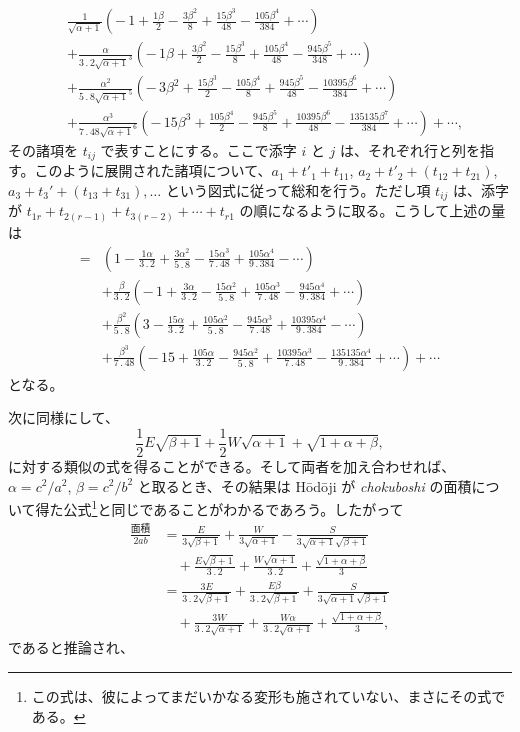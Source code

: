 \documentclass[11pt]{article}
\newcommand{\scanpage}[2]{\clearpage\setcounter{footnote}{0}\noindent{\footnotesize\color{gray}PDF #1 頁 · #2}\par\medskip}
\begin{document}
\scanpage{0334}{印刷頁 320}
\[
\begin{aligned}
&\frac{1}{\sqrt{\alpha+1}}\left(-\,1+\frac{1\beta}{2}-\frac{3\beta^2}{8}+\frac{15\beta^3}{48}-\frac{105\beta^4}{384}+\cdots\right)\\
&+\frac{\alpha}{3\,.\,2\sqrt{\alpha+1}^{3}}\left(-\,1\beta+\frac{3\beta^2}{2}-\frac{15\beta^3}{8}+\frac{105\beta^4}{48}-\frac{945\beta^5}{348}+\cdots\right)\\
&+\frac{\alpha^2}{5\,.\,8\sqrt{\alpha+1}^{5}}\left(-\,3\beta^2+\frac{15\beta^3}{2}-\frac{105\beta^4}{8}+\frac{945\beta^5}{48}-\frac{10395\beta^6}{384}+\cdots\right)\\
&+\frac{\alpha^3}{7\,.\,48\sqrt{\alpha+1}^{6}}\left(-\,15\beta^3+\frac{105\beta^4}{2}-\frac{945\beta^5}{8}+\frac{10395\beta^6}{48}-\frac{135135\beta^7}{384}+\cdots\right)+\cdots,
\end{aligned}
\]
その諸項を $t_{ij}$ で表すことにする。ここで添字 $i$ と $j$ は、それぞれ行と列を指す。このように展開された諸項について、$a_1+t'_1+t_{11}$, $a_2+t'_2+(t_{12}+t_{21})$, $a_3+t_3'+(t_{13}+t_{31}),\ldots$ という図式に従って総和を行う。ただし項 $t_{ij}$ は、添字が $t_{1r}+t_{2(r-1)}+t_{3(r-2)}+\cdots+t_{r1}$ の順になるように取る。こうして上述の量は
\[
\begin{aligned}
={}&\left(1-\frac{1\alpha}{3\,.\,2}+\frac{3\alpha^2}{5\,.\,8}-\frac{15\alpha^3}{7\,.\,48}+\frac{105\alpha^4}{9\,.\,384}-\cdots\right)\\
&+\frac{\beta}{3\,.\,2}\left(-\,1+\frac{3\alpha}{3\,.\,2}-\frac{15\alpha^2}{5\,.\,8}+\frac{105\alpha^3}{7\,.\,48}-\frac{945\alpha^4}{9\,.\,384}+\cdots\right)\\
&+\frac{\beta^2}{5\,.\,8}\left(3-\frac{15\alpha}{3\,.\,2}+\frac{105\alpha^2}{5\,.\,8}-\frac{945\alpha^3}{7\,.\,48}+\frac{10395\alpha^4}{9\,.\,384}-\cdots\right)\\
&+\frac{\beta^3}{7\,.\,48}\left(-\,15+\frac{105\alpha}{3\,.\,2}-\frac{945\alpha^2}{5\,.\,8}+\frac{10395\alpha^3}{7\,.\,48}-\frac{135135\alpha^4}{9\,.\,384}+\cdots\right)+\cdots
\end{aligned}
\]
となる。

次に同様にして、
\[
\frac{1}{2}E\sqrt{\beta+1}+\frac{1}{2}W\sqrt{\alpha+1}+\sqrt{1+\alpha+\beta},
\]
に対する類似の式を得ることができる。そして両者を加え合わせれば、$\alpha=c^2/a^2$, $\beta=c^2/b^2$ と取るとき、その結果は Hōdōji が \emph{chokuboshi} の面積について得た公式\footnote{この式は、彼によってまだいかなる変形も施されていない、まさにその式である。}と同じであることがわかるであろう。したがって
\[
\begin{aligned}
\frac{\text{面積}}{2ab}&=\frac{E}{3\sqrt{\beta+1}}+\frac{W}{3\sqrt{\alpha+1}}-\frac{S}{3\sqrt{\alpha+1}\sqrt{\beta+1}}\\
&\quad+\frac{E\sqrt{\beta+1}}{3\,.\,2}+\frac{W\sqrt{\alpha+1}}{3\,.\,2}+\frac{\sqrt{1+\alpha+\beta}}{3}\\
&=\frac{3E}{3\,.\,2\sqrt{\beta+1}}+\frac{E\beta}{3\,.\,2\sqrt{\beta+1}}+\frac{S}{3\sqrt{\alpha+1}\sqrt{\beta+1}}\\
&\quad+\frac{3W}{3\,.\,2\sqrt{\alpha+1}}+\frac{W\alpha}{3\,.\,2\sqrt{\alpha+1}}+\frac{\sqrt{1+\alpha+\beta}}{3},
\end{aligned}
\]
であると推論され、
\end{document}
